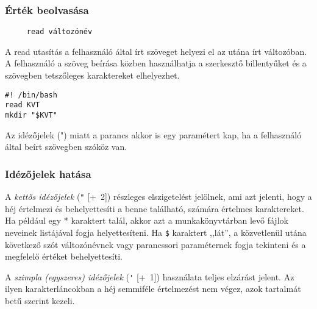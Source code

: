 

\subsubsection*{Érték beolvasása}
\begin{verbatim}
     read változónév
\end{verbatim}
A read utasítás a felhasználó által írt szöveget helyezi el az utána írt változóban. A felhasználó a szöveg beírása közben használhatja a szerkesztő billentyűket és a szövegben tetszőleges karaktereket elhelyezhet.


\begin{lstlisting}
#! /bin/bash
read KVT
mkdir "$KVT"
\end{lstlisting}
Az idézőjelek (") miatt a parancs akkor is egy paramétert kap, ha a felhasználó által beírt szövegben szóköz van.






\subsubsection*{Idézőjelek hatása}
A \emph{kettős idézőjelek} (\verb.". [\Alt+\ 2]) részleges elszigetelést jelölnek, ami azt jelenti, hogy a héj értelmezi és behelyettesíti a benne található, számára értelmes karaktereket. Ha például egy * karaktert talál, akkor azt a munkakönyvtárban levő fájlok neveinek listájával fogja helyettesíteni. Ha \verb.$. karaktert ,,lát'', a közvetlenül utána következő szót változónévnek vagy parancssori paraméternek fogja tekinteni és a megfelelő értéket behelyettesíti.

A \emph{szimpla (egyszeres) idézőjelek} (\verb.'. [\Alt+\ 1]) használata teljes elzárást jelent. Az ilyen karakterláncokban a héj semmiféle értelmezést nem végez, azok tartalmát betű szerint kezeli.


